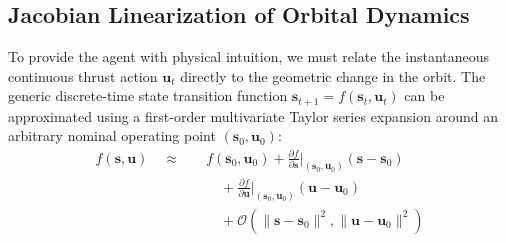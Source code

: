 \documentclass[paper]{ieice}
\begin{document}
\subsection{Jacobian Linearization of Orbital Dynamics}
To provide the agent with physical intuition, we must relate the instantaneous continuous thrust action $\mathbf{u}_t$ directly to the geometric change in the orbit. The generic discrete-time state transition function $\mathbf{s}_{t+1} = f(\mathbf{s}_t, \mathbf{u}_t)$ can be approximated using a first-order multivariate Taylor series expansion around an arbitrary nominal operating point $(\mathbf{s}_0, \mathbf{u}_0)$:
\begin{align}
    f(\mathbf{s}, \mathbf{u})
    \quad \approx \quad &
    f(\mathbf{s}_0, \mathbf{u}_0) + \frac{\partial f}{\partial \mathbf{s}}\bigg|_{(\mathbf{s}_0, \mathbf{u}_0)} (\mathbf{s} - \mathbf{s}_0) \\
    & \quad {} + \frac{\partial f}{\partial \mathbf{u}}\bigg|_{(\mathbf{s}_0, \mathbf{u}_0)} (\mathbf{u} - \mathbf{u}_0) \nonumber \\
    & \quad {} + \mathcal{O}(\|\mathbf{s} - \mathbf{s}_0\|^2, \|\mathbf{u} - \mathbf{u}_0\|^2) \nonumber
\end{align}
\end{document}
